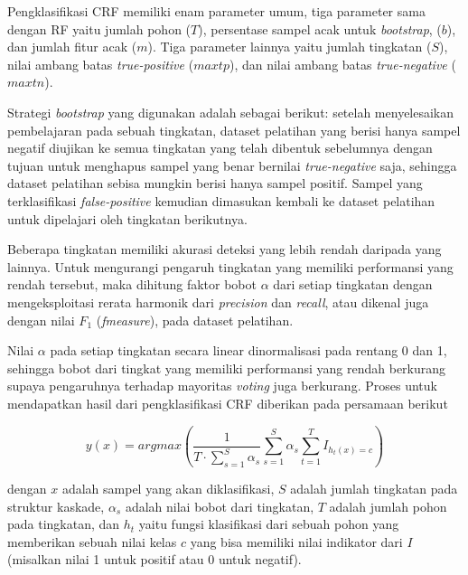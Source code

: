 Pengklasifikasi CRF memiliki enam parameter umum, tiga parameter sama dengan
RF yaitu jumlah pohon ($T$), persentase sampel acak untuk \textit{bootstrap},
($b$), dan jumlah fitur acak ($m$).
Tiga parameter lainnya yaitu jumlah tingkatan ($S$), nilai ambang batas
\textit{true-positive} ($maxtp$), dan nilai ambang batas
\textit{true-negative} ($maxtn$).

Strategi \textit{bootstrap} yang digunakan adalah sebagai berikut: setelah
menyelesaikan pembelajaran pada sebuah tingkatan, dataset pelatihan yang berisi
hanya sampel negatif diujikan ke semua tingkatan yang telah dibentuk
sebelumnya dengan tujuan untuk menghapus sampel yang benar bernilai
\textit{true-negative} saja, sehingga dataset pelatihan sebisa mungkin berisi
hanya sampel positif.
Sampel yang terklasifikasi \textit{false-positive} kemudian dimasukan kembali
ke dataset pelatihan untuk dipelajari oleh tingkatan berikutnya.

Beberapa tingkatan memiliki akurasi deteksi yang lebih rendah daripada
yang lainnya.
Untuk mengurangi pengaruh tingkatan yang memiliki performansi yang rendah
tersebut, maka dihitung faktor bobot $\alpha$ dari setiap tingkatan dengan
mengeksploitasi rerata harmonik dari \textit{precision} dan \textit{recall},
atau dikenal juga dengan nilai $F_1$ (\textit{fmeasure}),
pada dataset pelatihan.

Nilai $\alpha$ pada setiap tingkatan secara linear dinormalisasi pada rentang 0
dan 1, sehingga bobot dari tingkat yang memiliki performansi yang rendah
berkurang supaya pengaruhnya terhadap mayoritas \textit{voting} juga berkurang.
Proses untuk mendapatkan hasil dari pengklasifikasi CRF diberikan pada persamaan berikut

\begin{equation}\label{eq:crf}
	y(x) = argmax \left(
			\frac{1}{T \cdot \sum^{S}_{s=1} \alpha_{s} }
			\sum\limits_{s=1}^{S} \alpha_{s}
			\sum\limits^{T}_{t=1} I_{h_{t} (x) = c}
		\right)
\end{equation}

dengan $x$ adalah sampel yang akan diklasifikasi,
$S$ adalah jumlah tingkatan pada struktur kaskade,
$\alpha_{s}$ adalah nilai bobot dari tingkatan,
$T$ adalah jumlah pohon pada tingkatan, dan
$h_{t}$ yaitu fungsi klasifikasi dari sebuah pohon yang memberikan sebuah nilai
kelas $c$ yang bisa memiliki nilai indikator dari $I$
(misalkan nilai 1 untuk positif atau 0 untuk negatif).
